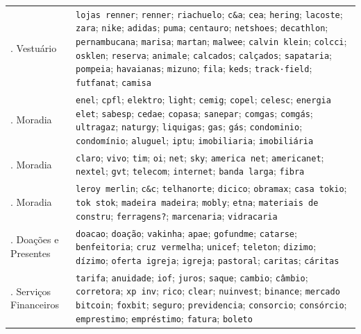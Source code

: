 \begin{apendicesenv}
\begin{longtable}{>{\raggedright\arraybackslash}p{3.1cm} >{\raggedright\arraybackslash}p{11.6cm}}
\addlinespace[2pt]
21. Vestuário & \texttt{lojas renner}; \texttt{renner}; \texttt{riachuelo}; \texttt{c\&a}; \texttt{cea}; \texttt{hering}; \texttt{lacoste}; \texttt{zara}; \texttt{nike}; \texttt{adidas}; \texttt{puma}; \texttt{centauro}; \texttt{netshoes}; \texttt{decathlon}; \texttt{pernambucana}; \texttt{marisa}; \texttt{martan}; \texttt{malwee}; \texttt{calvin klein}; \texttt{colcci}; \texttt{osklen}; \texttt{reserva}; \texttt{animale}; \texttt{calcados}; \texttt{calçados}; \texttt{sapataria}; \texttt{pompeia}; \texttt{havaianas}; \texttt{mizuno}; \texttt{fila}; \texttt{keds}; \texttt{track·field}; \texttt{futfanat}; \texttt{camisa} \\
\addlinespace[2pt]
22. Moradia & \texttt{enel}; \texttt{cpfl}; \texttt{elektro}; \texttt{light}; \texttt{cemig}; \texttt{copel}; \texttt{celesc}; \texttt{energia elet}; \texttt{sabesp}; \texttt{cedae}; \texttt{copasa}; \texttt{sanepar}; \texttt{comgas}; \texttt{comgás}; \texttt{ultragaz}; \texttt{naturgy}; \texttt{liquigas}; \texttt{gas}; \texttt{gás}; \texttt{condominio}; \texttt{condomínio}; \texttt{aluguel}; \texttt{iptu}; \texttt{imobiliaria}; \texttt{imobiliária} \\
\addlinespace[2pt]
23. Moradia & \texttt{claro}; \texttt{vivo}; \texttt{tim}; \texttt{oi}; \texttt{net}; \texttt{sky}; \texttt{america net}; \texttt{americanet}; \texttt{nextel}; \texttt{gvt}; \texttt{telecom}; \texttt{internet}; \texttt{banda larga}; \texttt{fibra} \\
\addlinespace[2pt]
24. Moradia & \texttt{leroy merlin}; \texttt{c\&c}; \texttt{telhanorte}; \texttt{dicico}; \texttt{obramax}; \texttt{casa tokio}; \texttt{tok~stok}; \texttt{madeira madeira}; \texttt{mobly}; \texttt{etna}; \texttt{materiais de constru}; \texttt{ferragens?}; \texttt{marcenaria}; \texttt{vidracaria} \\
\addlinespace[2pt]
25. Doações e Presentes & \texttt{doacao}; \texttt{doação}; \texttt{vakinha}; \texttt{apae}; \texttt{gofundme}; \texttt{catarse}; \texttt{benfeitoria}; \texttt{cruz vermelha}; \texttt{unicef}; \texttt{teleton}; \texttt{dizimo}; \texttt{dízimo}; \texttt{oferta igreja}; \texttt{igreja}; \texttt{pastoral}; \texttt{caritas}; \texttt{cáritas} \\
\addlinespace[2pt]
26. Serviços Financeiros & \texttt{tarifa}; \texttt{anuidade}; \texttt{iof}; \texttt{juros}; \texttt{saque}; \texttt{cambio}; \texttt{câmbio}; \texttt{corretora}; \texttt{xp inv}; \texttt{rico}; \texttt{clear}; \texttt{nuinvest}; \texttt{binance}; \texttt{mercado bitcoin}; \texttt{foxbit}; \texttt{seguro}; \texttt{previdencia}; \texttt{consorcio}; \texttt{consórcio}; \texttt{emprestimo}; \texttt{empréstimo}; \texttt{fatura}; \texttt{boleto} \\

\end{longtable}
\end{apendicesenv}
